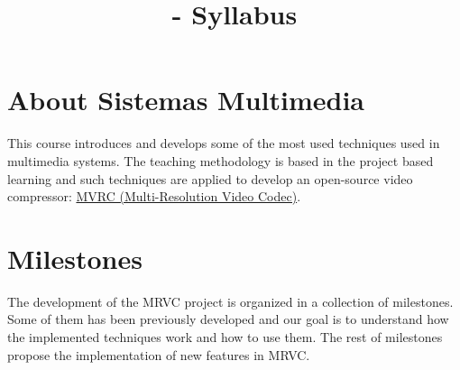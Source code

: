 

\title{\SM - Syllabus}

\maketitle

\section{About Sistemas Multimedia}

This course introduces and develops some of the most used techniques
used in multimedia systems. The teaching methodology is based in the
project based learning and such techniques are applied to develop an
open-source video
compressor: \href{https://github.com/Sistemas-Multimedia/MRVC}{MVRC
(Multi-Resolution Video Codec)}.

\section{Milestones}

The development of the MRVC project is organized in a collection of
milestones. Some of them has been previously developed and our goal is
to understand how the implemented techniques work and how to use
them. The rest of milestones propose the implementation of new
features in MRVC.

